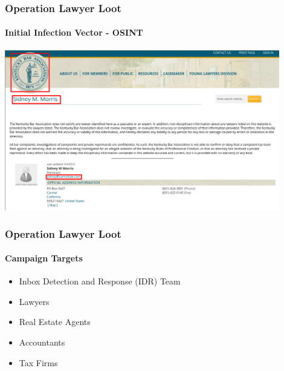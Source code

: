 \documentclass[aspectratio=169]{beamer}
\begin{document}
\begin{frame}
  \frametitle{Operation Lawyer Loot}
  \framesubtitle{Initial Infection Vector - OSINT}
  \begin{center}
    \includegraphics[width=12cm]{sidneymorris}
  \end{center}
\end{frame}

{%
\begin{frame}
  \frametitle{Operation Lawyer Loot}
  \framesubtitle{Campaign Targets}
  \begin{itemize}
    \item{Inbox Detection and Response (IDR)} Team
    \item{Lawyers}
    \item{Real Estate Agents}
    \item{Accountants}
    \item{Tax Firms}
  \end{itemize}
\end{frame}
}
\end{document}
